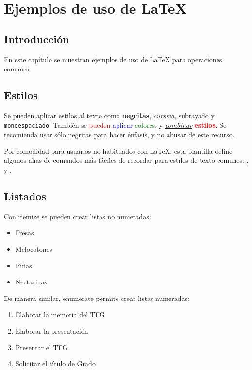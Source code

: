\chapter{Ejemplos de uso de LaTeX}\label{cap:ejemplos}


\section{Introducción}
En este capítulo se muestran ejemplos de uso de \LaTeX{} para operaciones comunes. 

\section{Estilos}\label{sec:estilos}
Se pueden aplicar estilos al texto como \textbf{negritas}, \textit{cursiva}, \underline{subrayado} y \texttt{monoespaciado}. También se \textcolor{red}{pueden} \textcolor{blue}{aplicar} \textcolor{green}{colores}, y \underline{\textit{combinar}} \textbf{\textcolor{red}{estilos}}. Se recomienda usar sólo negritas para hacer énfasis, y no abusar de este recurso.

Por comodidad para usuarios no habituados con LaTeX, esta plantilla define algunos alias de comandos más fáciles de recordar para estilos de texto comunes: ,  y .

\section{Listados}
Con itemize se pueden crear listas no numeradas:

\begin{itemize}
    \item Fresas
    \item Melocotones
    \item Piñas
    \item Nectarinas
\end{itemize}

De manera similar, enumerate permite crear listas numeradas:

\begin{enumerate}
    \item Elaborar la memoria del TFG
    \item Elaborar la presentación
    \item Presentar el TFG
    \item Solicitar el título de Grado
\end{enumerate}

